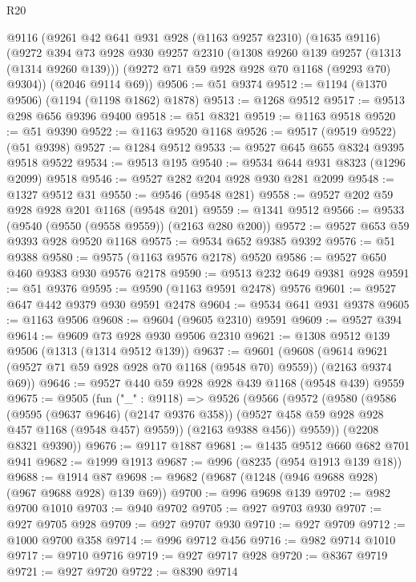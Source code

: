 \begin{lexlean}{R20}
\begin{coremodule}
    @9116
    (@9261
      @42
      @641
      @931
      @928
      (@1163 @9257 @2310)
      (@1635 @9116)
      (@9272
        @394
        @73
        @928
        @930
        @9257
        @2310
        (@1308 @9260 @139 @9257 (@1313 (@1314 @9260 @139)))
        (@9272 @71 @59 @928 @928 @70 @1168 (@9293 @70) @9304))
      (@2046 @9114 @69))
@9506 := @51 @9374
@9512 := @1194 (@1370 @9506) (@1194 (@1198 @1862) @1878)
@9513 := @1268 @9512
@9517 := @9513 @298 @656 @9396 @9400
@9518 := @51 @8321
@9519 := @1163 @9518
@9520 := @51 @9390
@9522 := @1163 @9520 @1168
@9526 := @9517 (@9519 @9522) (@51 @9398)
@9527 := @1284 @9512
@9533 := @9527 @645 @655 @8324 @9395 @9518 @9522
@9534 := @9513 @195
@9540 := @9534 @644 @931 @8323 (@1296 @2099) @9518
@9546 := @9527 @282 @204 @928 @930 @281 @2099
@9548 := @1327 @9512 @31
@9550 := @9546 (@9548 @281)
@9558 := @9527 @202 @59 @928 @928 @201 @1168 (@9548 @201)
@9559 := @1341 @9512
@9566 := @9533 (@9540 (@9550 (@9558 @9559)) (@2163 @280 @200))
@9572 := @9527 @653 @59 @9393 @928 @9520 @1168
@9575 := @9534 @652 @9385 @9392
@9576 := @51 @9388
@9580 := @9575 (@1163 @9576 @2178) @9520
@9586 := @9527 @650 @460 @9383 @930 @9576 @2178
@9590 := @9513 @232 @649 @9381 @928
@9591 := @51 @9376
@9595 := @9590 (@1163 @9591 @2478) @9576
@9601 := @9527 @647 @442 @9379 @930 @9591 @2478
@9604 := @9534 @641 @931 @9378
@9605 := @1163 @9506
@9608 := @9604 (@9605 @2310) @9591
@9609 := @9527 @394
@9614 := @9609 @73 @928 @930 @9506 @2310
@9621 := @1308 @9512 @139 @9506 (@1313 (@1314 @9512 @139))
@9637 := @9601
    (@9608 (@9614 @9621 (@9527 @71 @59 @928 @928 @70 @1168 (@9548 @70) @9559)) (@2163 @9374 @69))
@9646 := @9527 @440 @59 @928 @928 @439 @1168 (@9548 @439) @9559
@9675 := @9505
    (fun ("_" : @9118) =>
    @9526
      (@9566
        (@9572
          (@9580
            (@9586
              (@9595 (@9637 @9646) (@2147 @9376 @358))
              (@9527 @458 @59 @928 @928 @457 @1168 (@9548 @457) @9559))
            (@2163 @9388 @456))
          @9559))
      (@2208 @8321 @9390))
@9676 := @9117 @1887
@9681 := @1435 @9512 @660 @682 @701 @941
@9682 := @1999 @1913
@9687 := @996 (@8235 (@954 @1913 @139 @18))
@9688 := @1914 @87
@9698 := @9682 (@9687 (@1248 (@946 @9688 @928) (@967 @9688 @928) @139 @69))
@9700 := @996 @9698 @139
@9702 := @982 @9700 @1010
@9703 := @940 @9702
@9705 := @927 @9703 @930
@9707 := @927 @9705 @928
@9709 := @927 @9707 @930
@9710 := @927 @9709
@9712 := @1000 @9700 @358
@9714 := @996 @9712 @456
@9716 := @982 @9714 @1010
@9717 := @9710 @9716
@9719 := @927 @9717 @928
@9720 := @8367 @9719
@9721 := @927 @9720
@9722 := @8390 @9714

\end{coremodule}
\end{lexlean}
